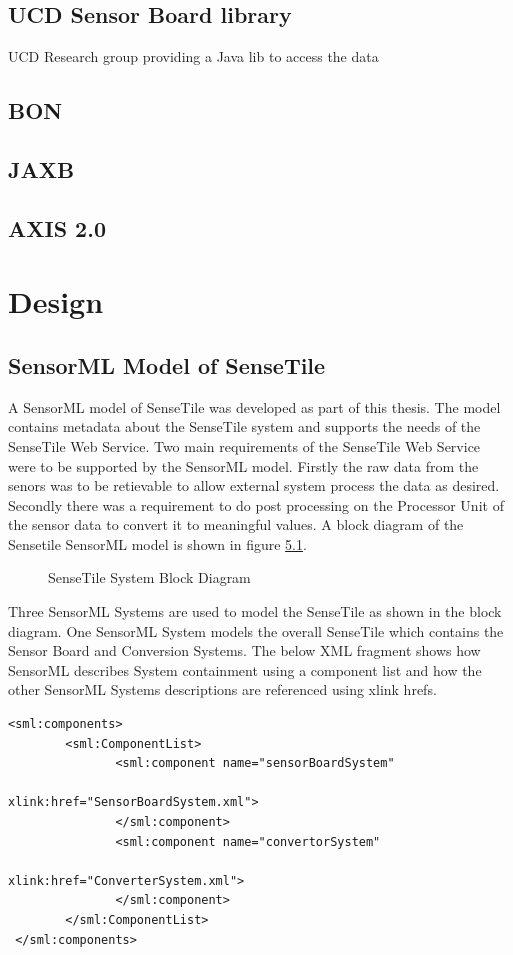 \documentclass[]{final_report}
\begin{document}
\section{UCD Sensor Board library}
UCD Research group providing a Java lib to access the data 
\section{BON}
\section{JAXB}
\section{AXIS 2.0}


\chapter{Design}
\section{SensorML Model of SenseTile}

A SensorML model of SenseTile was developed as part of this thesis. The model contains metadata about the SenseTile system and supports the needs of the SenseTile Web Service. Two main requirements of the SenseTile Web Service were to be supported by the SensorML model. Firstly the raw data from the senors was to be retievable to allow external system process the data as desired. Secondly there was a requirement to do post processing on the Processor Unit of the sensor data to convert it to meaningful values. A block diagram of the Sensetile SensorML model is shown in figure \ref{fig:SenseTileSystem}.

\begin{figure}[h]
\caption{SenseTile System Block Diagram}\label{fig:SenseTileSystem}
\end{figure}

Three SensorML Systems are used to model the SenseTile as shown in the block diagram. One SensorML System models the overall SenseTile which contains the Sensor Board and Conversion Systems. The below XML fragment shows how SensorML describes System containment using a component list and how the other SensorML Systems descriptions are referenced using xlink hrefs.

\lstset{language=XML,basicstyle=\scriptsize,frame=single}
\begin{lstlisting}
<sml:components>
        <sml:ComponentList>
               <sml:component name="sensorBoardSystem" 
                                          xlink:href="SensorBoardSystem.xml">
               </sml:component>
               <sml:component name="convertorSystem"  
                                          xlink:href="ConverterSystem.xml">
               </sml:component>
        </sml:ComponentList>			   
 </sml:components>
\end{lstlisting}
\end{document}
